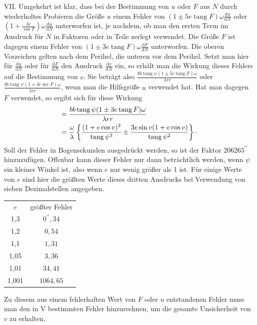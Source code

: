 VII. Umgekehrt ist klar, dass bei der Bestimmung von $u$ oder $F$ aus $N$ durch wiederholtes Probieren die Größe $u$ einem Fehler von $(1\pm5e\operatorname{tang}F)\omega\frac{\mathrm{d}u}{\mathrm{d}N}$ oder $\left(1+\frac{3e}{\cos F}\right)\omega\frac{\mathrm{d}u}{\mathrm{d}N}$ unterworfen ist, je nachdem, ob man den ersten Term im Ausdruck für $N$ in Faktoren oder in Teile zerlegt verwendet. Die Größe $F$ ist dagegen einem Fehler von $(1\pm3e\operatorname{tang}F)\omega\frac{\mathrm{d}F}{\mathrm{d}N}$ unterworfen. Die oberen Vorzeichen gelten nach dem Perihel, die unteren vor dem Perihel. Setzt man hier für $\frac{\mathrm{d}u}{\mathrm{d}N}$ oder für $\frac{\mathrm{d}F}{\mathrm{d}N}$ den Ausdruck $\frac{\mathrm{d}v}{\mathrm{d}N}$ ein, so erhält man die Wirkung dieses Fehlers auf die Bestimmung von $v$. Sie beträgt also $\frac{bb\operatorname{tang}\psi(1\pm5e\operatorname{tang}F)\omega}{\lambda rr}$ oder $\frac{bb\operatorname{tang}\psi(1+3e\operatorname{sec} F)\omega}{\lambda rr}$, wenn man die Hilfsgröße $u$ verwendet hat. Hat man dagegen $F$ verwendet, so ergibt sich für diese Wirkung
\[
\begin{aligned}
&=\frac{bb\operatorname{tang}\psi(1\pm3e\operatorname{tang}F)\omega}{\lambda rr}\\
&=\frac{\omega}{\lambda}\left\{\frac{(1+e\cos v)^2}{\operatorname{tang}\psi^3}\pm\frac{3e\sin v(1+e\cos v)}{\operatorname{tang}\psi^2}\right\}\raisebox{.45ex}{.}
\end{aligned}
\]
Soll der Fehler in Bogensekunden ausgedrückt werden, so ist der Faktor $206265^{\prime\prime}$ hinzuzufügen. Offenbar kann dieser Fehler nur dann beträchtlich werden, wenn $\psi$ ein kleiner Winkel ist, also wenn $e$ nur wenig größer als 1 ist. Für einige Werte von $e$ sind hier die größten Werte dieses dritten Ausdrucks bei Verwendung von sieben Dezimalstellen angegeben.

\begin{center}
\begin{tabular}{c|c}
$e$ & größter Fehler \\
1,3 & $0^{\prime\prime}{,}34$ \\
1,2 & $0{,}54$ \\
1,1 & $1{,}31$ \\
1,05 & $3{,}36$ \\
1,01 & $34{,}41$ \\
1,001 & $1064{,}65$ \\
\end{tabular}
\end{center}
\noindent Zu diesem aus einem fehlerhaften Wert von $F$ oder $u$ entstandenen Fehler muss man den in V bestimmten Fehler hinzurechnen, um die gesamte Unsicherheit von $v$ zu erhalten.

